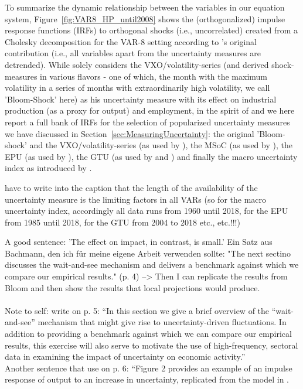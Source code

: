 \documentclass[a4paper,11pt,listof=nochaptergap,oneside,pointednumbers,bibtotoc,bigheadings,liststotoc]{scrbook}
\theoremstyle{mysatz}
\theoremstyle{mydefinition}
\theoremstyle{mybemerkung}
\begin{document}
\begin{itemize}
To summarize the dynamic relationship between the variables in our equation system, Figure~\ref{fig:VAR8_HP_until2008} shows the (orthogonalized) impulse response functions (IRFs) to orthogonal shocks (i.e., uncorrelated) created from a Cholesky decomposition for the VAR-8 setting according to \citet{bloom:09}'s original contribution (i.e., all variables apart from the uncertainty measures are detrended). While \citet{bloom:09} solely considers the VXO/volatility-series (and derived shock-measures in various flavors - one of which, the month with the maximum volatility in a series of months with extraordinarily high volatility, we call 'Bloom-Shock' here) as his uncertainty measure with its effect on industrial production (as a proxy for output) and employment, in the spirit of \citet{juradoetal:15} and \citet{bontempietal:16} we here report a full bank of IRFs for the selection of popularized uncertainty measures we have discussed in Section~\ref{sec:MeasuringUncertainty}: the original 'Bloom-shock' and the VXO/volatility-series (as used by \citealp{bloom:09}), the MSoC (as used by \citealp{leducandliu:16}), the EPU (as used by \citealp{bakeretal:15}), the GTU (as used by \citealp{bontempietal:16} and \citealp{castelnuovoandtran:17}) and finally the macro uncertainty index as introduced by \citet{juradoetal:15}.


have to write into the caption that the length of the availability of the uncertainty measure is the limiting factors in all VARs (so for the macro uncertainty index, accordingly all data runs from 1960 until 2018, for the EPU from 1985 until 2018, for the GTU from 2004 to 2018 etc., etc.!!!)



A good sentence: 'The effect on impact, in contrast, is small.' 
Ein Satz aus Bachmann, den ich für meine eigene Arbeit verwenden sollte: "The next sectino discusses the wait-and-see mechanism and delivers a benchmark against which we compare our empirical results." (p. 4) --> Then I can replicate the results from Bloom and then show the results that local projections would produce.\\
\\
Note to self: \citet{bachmannetal:13} write on p. 5: ``In this section we give a brief overview of the ``wait-and-see'' mechanism that might give rise to uncertainty-driven fluctuations. In addition to providing a benchmark against which we can compare our empirical results, this exercise will also serve to motivate the use of high-frequency, sectoral data in examining the impact of uncertainty on economic activity.''\\
Another sentence that \citet{bachmannetal:13} use on p. 6: ``Figure 2 provides an example of an impulse response of output to an increase in uncertainty, replicated from the model in \citet{bloom:09}.



\end{itemize}
\end{document}
